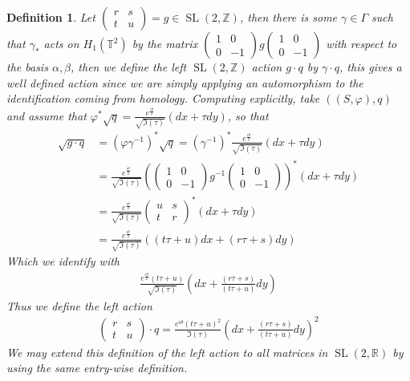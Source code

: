 \documentclass{article}
\newtheorem{defn}{Definition}
\newcommand{\slr}{\operatorname{SL}(2,\mathbb{R})}
\newcommand{\slz}{\operatorname{SL}(2,\mathbb{Z})}
\begin{document}
        \begin{defn}\label{leftmultdefn}
            Let \(\begin{pmatrix} r & s \\ t & u \end{pmatrix} = g \in \slz\), then there is some \(\gamma \in \Gamma\) such that \(\gamma_*\) acts on \(H_1(\mathbb{T}^2)\) by the matrix \(\begin{pmatrix} 1 & 0 \\ 0 & -1 \end{pmatrix} g \begin{pmatrix} 1 & 0 \\ 0 & -1 \end{pmatrix}\) with respect to the basis \(\alpha,\beta\), then we define the left \(\slz\) action \(g \cdot q\) by \(\gamma \cdot q\), this gives a well defined action since we are simply applying an automorphism to the identification coming from homology. Computing explicitly, take \(((S,\varphi),q)\) and assume that \(\varphi^* \sqrt{q} = \frac{e^{\frac{i\theta}{2}}}{\sqrt{\Im(\tau)}}(dx + \tau dy)\), so that 
            \begin{align*}
                \sqrt{g\cdot q} &= (\varphi \gamma^{-1})^* \sqrt{q} = (\gamma^{-1})^* \frac{e^{\frac{i\theta}{2}}}{\sqrt{\Im(\tau)}}(dx + \tau dy) \\
                &= \frac{e^{\frac{i\theta}{2}}}{\sqrt{\Im(\tau)}}\left(\begin{pmatrix} 1 & 0 \\ 0 & -1 \end{pmatrix}g^{-1}\begin{pmatrix} 1 & 0 \\ 0 & -1 \end{pmatrix}\right)^*(dx + \tau dy) \\
                &= \frac{e^{\frac{i\theta}{2}}}{\sqrt{\Im(\tau)}}\begin{pmatrix} u & s \\ t & r \end{pmatrix}^*(dx + \tau dy) \\
                &= \frac{e^{\frac{i\theta}{2}}}{\sqrt{\Im(\tau)}} ((t\tau + u)dx + (r\tau + s)dy)
            \end{align*}
            Which we identify with
            \begin{align*}
                \frac{e^{\frac{i\theta}{2}}(t \tau + u)}{\sqrt{\Im(\tau)}} \left(dx + \frac{(r\tau + s)}{(t \tau + u)}dy\right)
            \end{align*}
            Thus we define the left action
            \begin{align*}
                \begin{pmatrix} r & s \\ t & u \end{pmatrix} \cdot q = \frac{e^{i\theta}(t \tau + u)^2}{\Im(\tau)}\left(dx + \frac{(r\tau + s)}{(t \tau + u)}dy\right)^2
            \end{align*}
            We may extend this definition of the left action to all matrices in \(\slr\) by using the same entry-wise definition.
        \end{defn}
\end{document}
